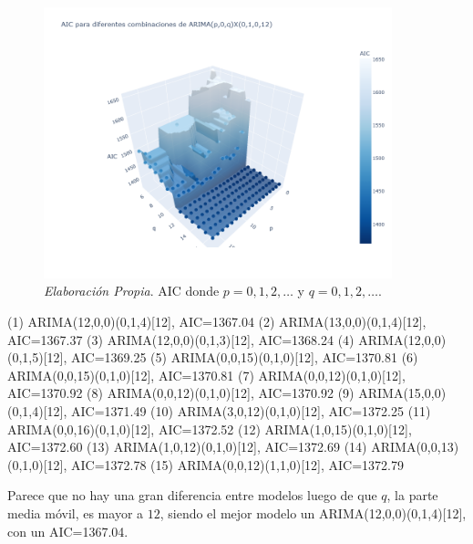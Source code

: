 \documentclass[12pt,letterpaper]{article}   %
\begin{document}
\begin{figure}[h!]
    \centering
    \includegraphics[width=0.9\textwidth]{imagenes/99-01.png}
    \caption{\textit{Elaboración Propia}. AIC donde $p = 0, 1, 2, \dots$ y $q = 0, 1, 2, \dots$.}
    \label{fig:FAC_FACP_yeo}
\end{figure}

\begin{smallconsole}[caption={donde $p = 0, 1, 2, \dots$ y $q = 0, 1, 2, \dots$.}]
(1) ARIMA(12,0,0)(0,1,4)[12], AIC=1367.04
(2) ARIMA(13,0,0)(0,1,4)[12], AIC=1367.37
(3) ARIMA(12,0,0)(0,1,3)[12], AIC=1368.24
(4) ARIMA(12,0,0)(0,1,5)[12], AIC=1369.25
(5) ARIMA(0,0,15)(0,1,0)[12], AIC=1370.81
(6) ARIMA(0,0,15)(0,1,0)[12], AIC=1370.81
(7) ARIMA(0,0,12)(0,1,0)[12], AIC=1370.92
(8) ARIMA(0,0,12)(0,1,0)[12], AIC=1370.92
(9) ARIMA(15,0,0)(0,1,4)[12], AIC=1371.49
(10) ARIMA(3,0,12)(0,1,0)[12], AIC=1372.25
(11) ARIMA(0,0,16)(0,1,0)[12], AIC=1372.52
(12) ARIMA(1,0,15)(0,1,0)[12], AIC=1372.60
(13) ARIMA(1,0,12)(0,1,0)[12], AIC=1372.69
(14) ARIMA(0,0,13)(0,1,0)[12], AIC=1372.78
(15) ARIMA(0,0,12)(1,1,0)[12], AIC=1372.79
\end{smallconsole}

Parece que no hay una gran diferencia entre modelos luego de que $q$, la parte media móvil, es mayor a $12$, siendo el mejor modelo un ARIMA(12,0,0)(0,1,4)[12], con un AIC=1367.04.
\end{document}
